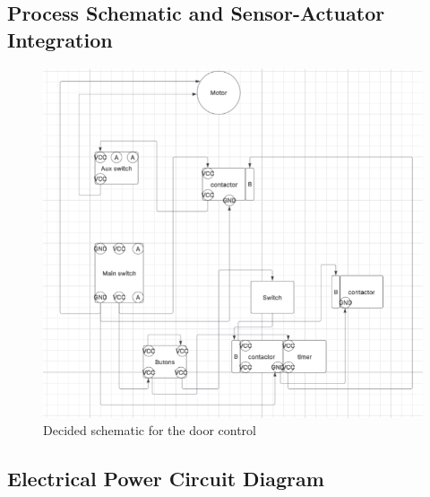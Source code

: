 \subsection{Process Schematic and Sensor-Actuator Integration} \label{sec:Process_Schematic_and_Sensor-Actuator_Integration}

\begin{figure}[H]
    \includegraphics[width=16cm]{Images/Q2/eletrical_circuit.png}
    \centering
    \caption{Decided schematic for the door control}
    \label{fig:eletrical_circuit}
\end{figure}

\subsection{Electrical Power Circuit Diagram} \label{sec:Electrical_Power_Circuit_Diagram}


